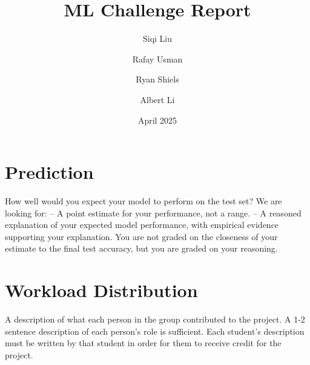 \documentclass{article}
\title{ML Challenge Report}
\author{
  Siqi Liu
  \and
  Rafay Usman
  \and
  Ryan Shiels
  \and
  Albert Li
}
\date{April 2025}
\begin{document}
\maketitle







\section{Prediction}
How well would you expect your model to perform on the test set? We are looking for:
– A point estimate for your performance, not a range.
– A reasoned explanation of your expected model performance, with empirical evidence supporting your explanation. You are not graded on the closeness of your estimate to the final test accuracy, but you are graded on your reasoning.

\section{Workload Distribution}
A description of what each person in the group contributed to the project. A 1-2 sentence description of each person’s role is sufficient. Each student’s description must be written by that
student in order for them to receive credit for the project.
\end{document}
